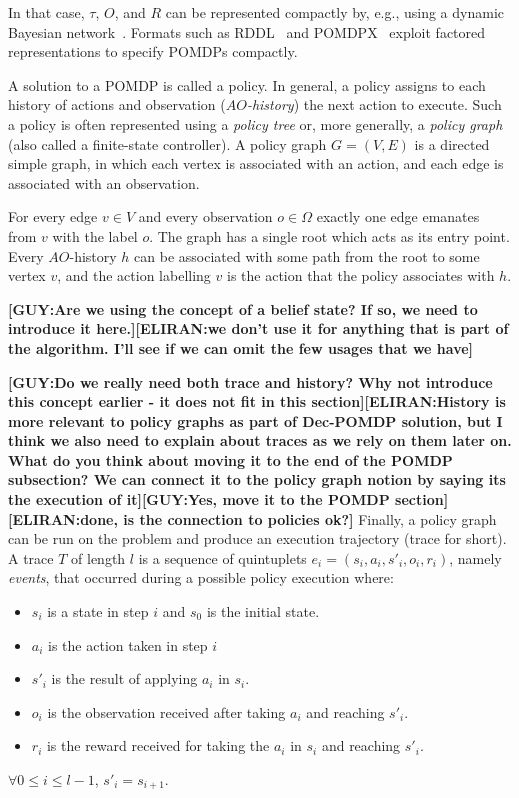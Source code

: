 \documentclass[letterpaper]{article} %
\newcommand{\eliran}[1]{\textbf{[\color{red}ELIRAN:#1]}}
\newcommand{\guy}[1]{\textbf{[\color{orange}GUY:#1]}}
\begin{document}
In that case, $\tau$, $O$, and $R$ can be represented compactly by, e.g., using a dynamic Bayesian network~\cite{}. Formats such as RDDL~\cite{} and POMDPX~\cite{} exploit factored representations to specify POMDPs compactly.

A solution to a POMDP is called a policy. In general, a policy assigns to each history of actions and observation ({\em $AO$-history}) the next action to execute. 
Such a policy is often represented using a {\em policy tree} or, more generally, a {\em policy graph} (also called a finite-state controller). 
A policy graph $G=(V,E)$ is a directed simple graph, in which each vertex is associated with an action, and each edge is associated with an observation.

For every edge $v\in V$ and every observation $o\in\Omega$ exactly one edge emanates from $v$ with the label $o$.
The graph has a single root which acts as its entry point. Every $AO$-history $h$ can be associated with some path from the root to some vertex $v$,
and the action labelling $v$ is the action that the policy associates with $h$.

\guy{Are we using the concept of a  belief state? If so, we need to introduce it here.}\eliran{we don't use it for anything that is part of the algorithm. I'll see if we can omit the few usages that we have}

\guy{Do we really need both trace and history? Why not introduce this concept earlier - it does not fit in this section}\eliran{History is more relevant to policy graphs as part of Dec-POMDP solution, but I think we also need to explain about traces as we rely on them later on. What do you think about moving it to the end of the POMDP subsection? We can connect it to the policy graph notion by saying its the execution of it}\guy{Yes, move it to the POMDP section}\eliran{done, is the connection to policies ok?}
Finally, a policy graph can be run on the problem and produce an execution trajectory (trace for short). A trace $T$ of length $l$ is a sequence of quintuplets $e_i = (s_i, a_i, s'_i, o_i, r_i)$, namely \emph{events}, that occurred during a possible policy execution where:
\begin{itemize}
    \item $s_i$ is a state in step $i$ and $s_0$ is the initial state.
    \item $a_i$ is the action taken in step $i$
    \item $s'_i$ is the result of applying
    $a_i$ in $s_i$.
    \item $o_i$ is the observation received after taking $a_i$ and reaching $s'_i$.
    \item $r_i$ is the reward received for taking the $a_i$ in $s_i$ and reaching $s'_i$.
\end{itemize}
$\forall 0\leq i \leq l-1$, $s'_i=s_{i+1}$.
\end{document}
